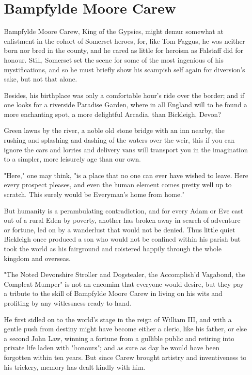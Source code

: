 \chapter{Bampfylde Moore Carew}

Bampfylde Moore Carew, King of the Gypsies, might demur somewhat at enlistment in the cohort of Somerset heroes, for, like Tom Faggus, he was neither born nor bred in the county, and he cared as little for heroism as Falstaff did for honour. Still, Somerset set the scene for some of the most ingenious of his mystifications, and so he must briefly show his scampish self again for diversion’s sake, but not that alone.

Besides, his birthplace was only a comfortable hour’s ride over the border; and if one looks for a riverside Paradise Garden, where in all England will to be found a more enchanting spot, a more delightful Arcadia, than Bickleigh, Devon?

Green lawns by the river, a noble old stone bridge with an inn nearby, the rushing and splashing and dashing of the waters over the weir, this   if you can ignore the cars and lorries and delivery vans   will transport you in the imagination to a simpler, more leisurely age than our own.

"Here," one may think, "is a place that no one can ever have wished to leave. Here every prospect pleases, and even the human element comes pretty well up to scratch. This surely would be Everyman's home from home."

But humanity is a perambulating contradiction, and for every Adam or Eve cast out of a rural Eden by poverty, another has broken away in search of adventure or fortune, led on by a wanderlust that would not be denied. Thus little quiet Bickleigh once produced a son who would not be confined within his parish but took the world as his fairground and roistered happily through the whole kingdom and overseas.

\Flourish 

"The Noted Devonshire Stroller and Dogstealer, the Accomplish'd Vagabond, the Compleat Mumper" is not an encomim that everyone would desire, but they pay a tribute to the skill of Bampfylde Moore Carew in living on his wits and profiting by any witlessness ready to hand.

He first sidled on to the world's stage in the reign of William III, and with a gentle push from destiny might have become either a cleric, like his father, or else a second John Law, winning a fortune from a gullible public and retiring into private life laden with "honours"; and as sure as day he would have been forgotten within ten years. But since Carew brought artistry and inventiveness to his trickery, memory has dealt kindly with him.

